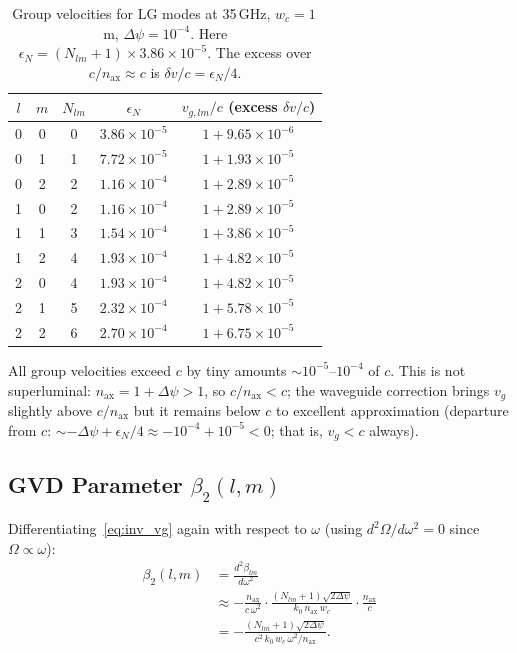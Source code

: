\documentclass[aps,prd,twocolumn,superscriptaddress]{revtex4-2}
\begin{document}
\begin{table}[h]
\caption{Group velocities for LG modes at 35\,GHz, $w_c=1$\,m,
$\Delta\psi=10^{-4}$.  Here $\epsilon_N = (N_{lm}+1)\times3.86\times10^{-5}$.
The excess over $c/n_\mathrm{ax}\approx c$ is
$\delta v/c = \epsilon_N/4$.}
\label{tab:vg}
\begin{ruledtabular}
\begin{tabular}{ccccc}
$l$ & $m$ & $N_{lm}$ & $\epsilon_N$ & $v_{g,lm}/c$
(excess $\delta v/c$) \\
\hline
0 & 0 & 0 & $3.86\times10^{-5}$ & $1 + 9.65\times10^{-6}$ \\
0 & 1 & 1 & $7.72\times10^{-5}$ & $1 + 1.93\times10^{-5}$ \\
0 & 2 & 2 & $1.16\times10^{-4}$ & $1 + 2.89\times10^{-5}$ \\
1 & 0 & 2 & $1.16\times10^{-4}$ & $1 + 2.89\times10^{-5}$ \\
1 & 1 & 3 & $1.54\times10^{-4}$ & $1 + 3.86\times10^{-5}$ \\
1 & 2 & 4 & $1.93\times10^{-4}$ & $1 + 4.82\times10^{-5}$ \\
2 & 0 & 4 & $1.93\times10^{-4}$ & $1 + 4.82\times10^{-5}$ \\
2 & 1 & 5 & $2.32\times10^{-4}$ & $1 + 5.78\times10^{-5}$ \\
2 & 2 & 6 & $2.70\times10^{-4}$ & $1 + 6.75\times10^{-5}$ \\
\end{tabular}
\end{ruledtabular}
\end{table}

All group velocities exceed $c$ by tiny amounts $\sim10^{-5}$--$10^{-4}$
of $c$.  This is not superluminal: $n_\mathrm{ax} = 1 + \Delta\psi > 1$,
so $c/n_\mathrm{ax} < c$; the waveguide correction brings $v_g$ slightly
above $c/n_\mathrm{ax}$ but it remains below $c$ to excellent approximation
(departure from $c$: $\sim-\Delta\psi + \epsilon_N/4 \approx
-10^{-4} + 10^{-5} < 0$; that is, $v_g < c$ always).

\subsection{GVD Parameter $\beta_2(l,m)$}

Differentiating~\eqref{eq:inv_vg} again with respect to $\omega$
(using $d^2\Omega/d\omega^2 = 0$ since $\Omega \propto \omega$):
\begin{align}
\beta_2(l,m) &= \frac{d^2\beta_{lm}}{d\omega^2} \nonumber\\
&\approx -\frac{n_\mathrm{ax}}{c\,\omega^2}
\cdot\frac{(N_{lm}+1)\sqrt{2\Delta\psi}}
{k_0\,n_\mathrm{ax}\,w_c}
\cdot\frac{n_\mathrm{ax}}{c}
\nonumber\\
&= -\frac{(N_{lm}+1)\sqrt{2\Delta\psi}}
{c^2\,k_0\,w_c\,\omega^2/n_\mathrm{ax}}.
\label{eq:beta2}
\end{align}
\end{document}

